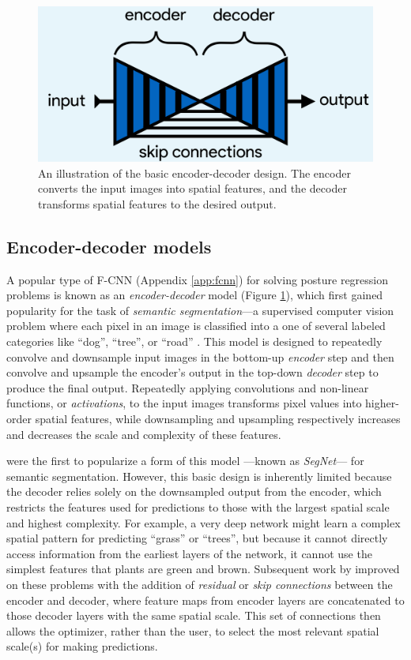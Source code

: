 \documentclass[11pt,a4paper,oneside]{article}
\begin{document}
\begin{appendices}
\begin{figure}

\begin{center}
\includegraphics[width=0.5\linewidth]{Graving_IMPRS_Thesis/figures/encoder_decoder_figure.pdf}
\end{center}
\caption{An illustration of the basic encoder-decoder design. The encoder converts the input images into spatial features, and the decoder transforms spatial features to the desired output.}\label{fig:encoder_decoder_figure}
\end{figure}

\subsection{Encoder-decoder models}
\label{box:encoder_decoder_box}
A popular type of F-CNN (Appendix \ref{app:fcnn}) for solving posture regression problems is known as an \textit{encoder-decoder} model (Figure \ref{fig:encoder_decoder_figure}), which first gained popularity for the task of \textit{semantic segmentation}—a supervised computer vision problem where each pixel in an image is classified into a one of several labeled categories like “dog”, “tree”, or “road” \citep{long2015fully}. This model is designed to repeatedly convolve and downsample input images in the bottom-up \textit{encoder} step and then convolve and upsample the encoder's output in the top-down \textit{decoder} step to produce the final output. Repeatedly applying convolutions and non-linear functions, or \textit{activations}, to the input images transforms pixel values into higher-order spatial features, while downsampling and upsampling respectively increases and decreases the scale and complexity of these features.

\cite{badrinarayanan2017segnet} were the first to popularize a form of this model —known as \textit{SegNet}— for semantic segmentation. However, this basic design is inherently limited because the decoder relies solely on the downsampled output from the encoder, which restricts the features used for predictions to those with the largest spatial scale and highest complexity. For example, a very deep network might learn a complex spatial pattern for predicting “grass” or “trees”, but because it cannot directly access information from the earliest layers of the network, it cannot use the simplest features that plants are green and brown. Subsequent work by \cite{ronneberger2015u} improved on these problems with the addition of \textit{residual} or \textit{skip connections} between the encoder and decoder, where feature maps from encoder layers are concatenated to those decoder layers with the same spatial scale. This set of connections then allows the optimizer, rather than the user, to select the most relevant spatial scale(s) for making predictions.


\end{appendices}
\end{document}
